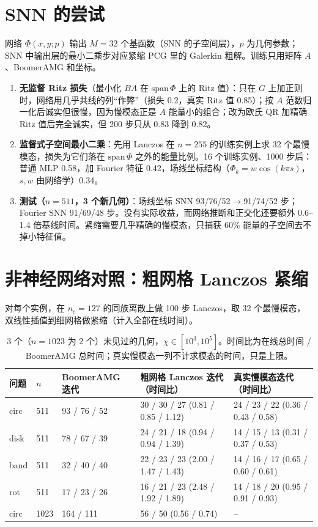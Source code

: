 \documentclass[11pt,a4paper]{ctexart}
\begin{document}
\section{SNN 的尝试}
网络 $\Phi(x,y;p)$ 输出 $M=32$ 个基函数（SNN 的子空间层），$p$ 为几何参数；SNN 中输出层的最小二乘步对应紧缩 PCG 里的 Galerkin 粗解。训练只用矩阵 $A$、BoomerAMG 和坐标。
\begin{enumerate}
\item \textbf{无监督 Ritz 损失}（最小化 $BA$ 在 $\mathrm{span}\,\Phi$ 上的 Ritz 值）：只在 $G$ 上加正则时，网络用几乎共线的列“作弊”（损失 0.2，真实 Ritz 值 0.85）；按 $A$ 范数归一化后诚实但很慢，因为慢模态正是 $A$ 能量小的组合；改为欧氏 QR 加精确 Ritz 值后完全诚实，但 200 步只从 0.83 降到 0.82。
\item \textbf{监督式子空间最小二乘}：先用 Lanczos 在 $n=255$ 的训练实例上求 32 个最慢模态，损失为它们落在 $\mathrm{span}\,\Phi$ 之外的能量比例。16 个训练实例、1000 步后：普通 MLP 0.58，加 Fourier 特征 0.42，场线坐标结构（$\Phi_k=w\cos(k\pi s)$，$s,w$ 由网络学）0.34。
\item \textbf{测试（$n=511$，3 个新几何）}：场线坐标 SNN 93/76/52$\to$91/74/52 步；Fourier SNN 91/69/48 步。没有实际收益，而网络推断和正交化还要额外 0.6--1.4 倍基线时间。紧缩需要几乎精确的慢模态，只捕获 60\% 能量的子空间去不掉小特征值。
\end{enumerate}

\section{非神经网络对照：粗网格 Lanczos 紧缩}
对每个实例，在 $n_c=127$ 的同族离散上做 100 步 Lanczos，取 32 个最慢模态，双线性插值到细网格做紧缩（计入全部在线时间）。
\begin{table}[H]
\centering\footnotesize\setlength{\tabcolsep}{3pt}
\begin{tabular}{lll l l}
\toprule
问题 & $n$ & BoomerAMG 迭代 & 粗网格 Lanczos 迭代（时间比） & 真实慢模态迭代（时间比） \\
\midrule
circ & 511 & 93 / 76 / 52 & 30 / 30 / 27 \;(0.81 / 0.85 / 1.12) & 24 / 23 / 22 \;(0.36 / 0.43 / 0.58)\\
disk & 511 & 78 / 67 / 39 & 24 / 21 / 18 \;(0.94 / 0.94 / 1.39) & 14 / 15 / 13 \;(0.31 / 0.37 / 0.53)\\
band & 511 & 32 / 40 / 40 & 22 / 23 / 23 \;(2.00 / 1.47 / 1.43) & 14 / 16 / 17 \;(0.65 / 0.60 / 0.61)\\
rot & 511 & 17 / 23 / 26 & 16 / 21 / 23 \;(2.48 / 1.92 / 1.89) & 14 / 18 / 20 \;(0.95 / 0.91 / 0.93)\\
circ & 1023 & 164 / 111 & 56 / 50 \;(0.56 / 0.74) & -- \\
\bottomrule
\end{tabular}
\caption{3 个（$n=1023$ 为 2 个）未见过的几何，$\chi\in[10^3,10^5]$。时间比为在线总时间 / BoomerAMG 总时间；真实慢模态一列不计求模态的时间，只是上限。}
\end{table}
\end{document}
